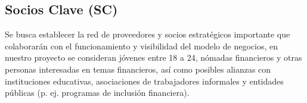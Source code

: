 {}
\subsection*{Socios Clave (SC)}

Se busca establecer la red de proveedores y socios estratégicos importante que colaborarán con el funcionamiento y visibilidad del modelo de negocios, en nuestro proyecto se consideran jóvenes entre 18 a 24, nómadas financieros y otras personas interesadas en temas financieros, así como posibles alianzas con instituciones educativas, asociaciones de trabajadores informales y entidades públicas (p. ej. programas de inclusión financiera).